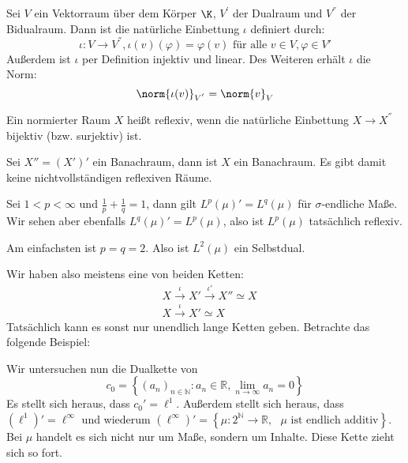 \begin{definition} \label{nat_einb} 
	Sei $V$ ein Vektorraum über dem Körper $\K$, $V^{'}$ der Dualraum und $V^{''}$ der Bidualraum. Dann ist die natürliche Einbettung $\iota$ definiert durch: 
	\[
	\iota: V \to V^{''}, \iota(v)(\varphi) = \varphi(v) \text{ für alle } v \in V, \varphi \in V'
	\]
	Außerdem ist $\iota$ per Definition injektiv und linear. Des Weiteren erhält $\iota$ die Norm:
	\[
	\norm{\iota(v)}_{V^{'}} = \norm{v}_V
	\]
\end{definition}

\begin{definition} 
	Ein normierter Raum $X$ heißt reflexiv, wenn die natürliche Einbettung $X \to X^{''}$ bijektiv (bzw. surjektiv) ist.
\end{definition}

\begin{rem} 
	Sei $X'' = (X')'$ ein Banachraum, dann ist $X$ ein Banachraum. Es gibt damit keine nichtvollständigen reflexiven Räume.
\end{rem}

\begin{ex} 
	Sei $1 < p < \infty$ und $\frac{1}{p}+\frac{1}{q} = 1$, dann gilt $L^p(\mu)' = L^q(\mu)$ für $\sigma$-endliche Maße. Wir sehen aber ebenfalls $L^q(\mu)' = L^p(\mu)$, also ist $L^p(\mu)$ tatsächlich reflexiv.
	
	Am einfachsten ist $p = q = 2$. Also ist $L^2(\mu)$ ein Selbstdual.
\end{ex}

\begin{rem} 
	Wir haben also meistens eine von beiden Ketten:
	\begin{align*}
		& X \xrightarrow{\iota} X' \xrightarrow{\iota'} X'' \simeq X \\
		& X \xrightarrow{\iota} X' \simeq X
	\end{align*}
	Tatsächlich kann es sonst nur unendlich lange Ketten geben. Betrachte das folgende Beispiel:
\end{rem}

\begin{ex} 
	Wir untersuchen nun die Dualkette von 
	\[
	c_0 = \left\{ (a_n)_{n \in \mathbb{N}} : a_n \in \mathbb{R}, \lim_{n \to \infty} a_n = 0 \right\}
	\]
	Es stellt sich heraus, dass $c_0' = \ell^1$. Außerdem stellt sich heraus, dass $(\ell^1)' = \ell^{\infty}$ und wiederum $(\ell^{\infty})' = \left\{ \mu : 2^{\mathbb{N}} \to \mathbb{R}, \text{ $\mu $ ist endlich additiv} \right\}$. Bei $\mu$ handelt es sich nicht nur um Maße, sondern um Inhalte. Diese Kette zieht sich so fort.
\end{ex}

